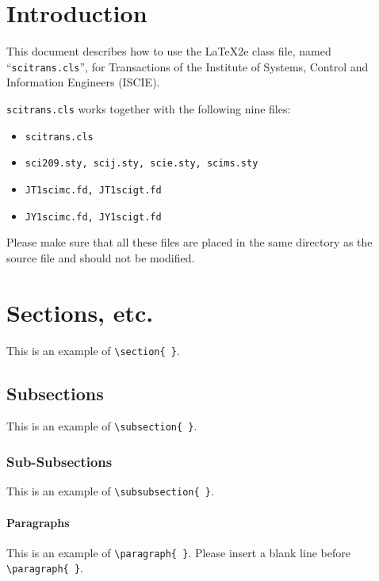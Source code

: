 \section{Introduction}
This document describes how to use the \LaTeX2e class file, named 
``{\tt scitrans.cls}'', for Transactions of the Institute of Systems, 
Control and Information Engineers (ISCIE). 

{\tt scitrans.cls} works together with the following nine files: 
\begin{itemize}
\item {\tt scitrans.cls}
\item {\tt sci209.sty, scij.sty, scie.sty, scims.sty}
\item {\tt JT1scimc.fd, JT1scigt.fd}
\item {\tt JY1scimc.fd, JY1scigt.fd}
\end{itemize}
Please make sure that all these files are placed in the same directory 
as the source file and should not be modified.


\section{Sections, etc.}
This is an example of \verb+\section{ }+.

\subsection{Subsections}
This is an example of \verb+\subsection{ }+.

\subsubsection{Sub-Subsections}
This is an example of \verb+\subsubsection{ }+.


\paragraph{Paragraphs}
This is an example of \verb+\paragraph{ }+.
Please insert a blank line before \verb+\paragraph{ }+.


